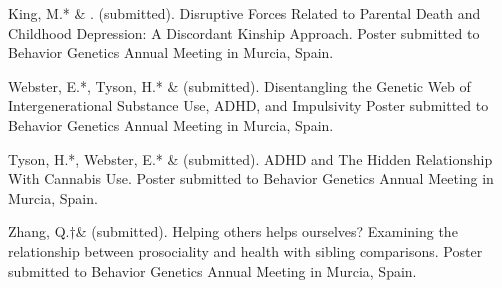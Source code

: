 


\item  King, M.* \& \meb. (submitted).  Disruptive Forces Related to Parental Death and Childhood Depression: A Discordant Kinship Approach. Poster submitted to Behavior Genetics Annual Meeting in Murcia, Spain.

\item Webster, E.*, Tyson, H.* \& \meb (submitted). Disentangling the Genetic Web of Intergenerational Substance Use, ADHD, and Impulsivity Poster submitted to Behavior Genetics Annual Meeting in Murcia, Spain.


\item Tyson, H.*, Webster, E.*  \& \meb (submitted). ADHD and The Hidden Relationship With Cannabis Use. Poster submitted to Behavior Genetics Annual Meeting in Murcia, Spain.

\item Zhang, Q.$\dagger$\& \meb (submitted). Helping others helps ourselves? Examining the relationship between prosociality and health with sibling comparisons. Poster submitted to Behavior Genetics Annual Meeting in Murcia, Spain.




%
%

%

%

%

%
